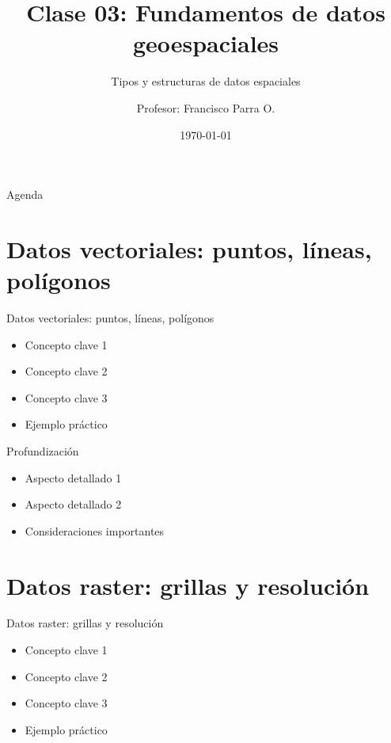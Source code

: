 \documentclass[10pt]{beamer}
\title{Clase 03: Fundamentos de datos geoespaciales}
\subtitle{Tipos y estructuras de datos espaciales}
\author{Profesor: Francisco Parra O.}
\institute{USACH - Ingeniería Civil en Informática}
\date{\today}
\begin{document}
\maketitle

\begin{frame}{Agenda}
    \tableofcontents
\end{frame}


\section{Datos vectoriales: puntos, líneas, polígonos}

\begin{frame}{Datos vectoriales: puntos, líneas, polígonos}
    \begin{itemize}
        \item Concepto clave 1
        \item Concepto clave 2
        \item Concepto clave 3
        \item Ejemplo práctico
    \end{itemize}
\end{frame}

\begin{frame}{Profundización}
    \begin{itemize}
        \item Aspecto detallado 1
        \item Aspecto detallado 2
        \item Consideraciones importantes
    \end{itemize}
\end{frame}

\section{Datos raster: grillas y resolución}

\begin{frame}{Datos raster: grillas y resolución}
    \begin{itemize}
        \item Concepto clave 1
        \item Concepto clave 2
        \item Concepto clave 3
        \item Ejemplo práctico
    \end{itemize}
\end{frame}
\end{document}
